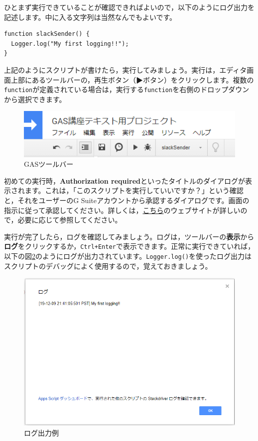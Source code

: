 \documentclass[uplatex,a4j]{jsarticle}
\begin{document}
ひとまず実行できていることが確認できればよいので，以下のようにログ出力を記述します。中に入る文字列は当然なんでもよいです。

\begin{lstlisting}[basicstyle=\ttfamily\footnotesize,frame=single,caption=Logging]
function slackSender() {
  Logger.log("My first logging!!");
}
\end{lstlisting}


上記のようにスクリプトが書けたら，実行してみましょう。実行は，エディタ画面上部にあるツールバーの，再生ボタン（▶ボタン）をクリックします。複数の\verb|function|が定義されている場合は，実行する\verb|function|を右側のドロップダウンから選択できます。

\begin{figure}[H]
 \centering
 \includegraphics[keepaspectratio, scale=0.7]{images/standalone_gas1.png}
 \caption{GASツールバー}
 \label{fig:standalone_gas1}
\end{figure}

初めての実行時，\textbf{Authorization required}といったタイトルのダイアログが表示されます。これは，「このスクリプトを実行していいですか？」という確認と，それをユーザーのG Suiteアカウントから承認するダイアログです。画面の指示に従って承認してください。詳しくは，\href{https://tonari-it.com/gas-script-approval/}{こちら}のウェブサイトが詳しいので，必要に応じて参照してください。

実行が完了したら，ログを確認してみましょう。ログは，ツールバーの\textbf{表示}から\textbf{ログ}をクリックするか，\verb|Ctrl+Enter|で表示できます。正常に実行できていれば，以下の図\ref{fig:standalone_gas2}のようにログが出力されています。\verb|Logger.log()|を使ったログ出力はスクリプトのデバッグによく使用するので，覚えておきましょう。

\begin{figure}[H]
 \centering
 \includegraphics[keepaspectratio, scale=0.7]{images/standalone_gas2.png}
 \caption{ログ出力例}
 \label{fig:standalone_gas2}
\end{figure}
\end{document}
